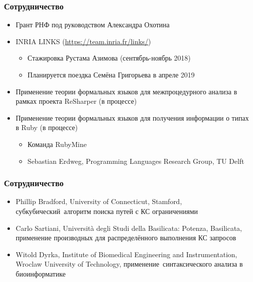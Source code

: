 \documentclass[xcolor=table]{beamer}
\begin{document}
\begin{frame}[fragile]
  \transwipe[direction=90]
  \frametitle{Сотрудничество}
\begin{itemize}
      \item Грант РНФ под руководством Александра Охотина
      \item INRIA LINKS (\url{https://team.inria.fr/links/})
      \begin{itemize}
         \item Стажировка Рустама Азимова (сентябрь-ноябрь 2018)
         \item Планируется поездка Семёна Григорьева в апреле 2019
      \end{itemize}
      \item Применение теории формальных языков для межпроцедурного анализа в рамках проекта ReSharper (в процессе)
      \item Применение теории формальных языков для получения информации о типах в Ruby (в процессе)
      \begin{itemize}
         \item Команда RubyMine
         \item Sebastian Erdweg, Programming Languages Research Group, TU Delft
      \end{itemize}
      
\end{itemize}
\end{frame}

\begin{frame}[fragile]
  \transwipe[direction=90]
  \frametitle{Сотрудничество}
\begin{itemize}
      \item Phillip Bradford, University of Connecticut, Stamford, субкубический~алгоритм поиска путей с КС ограничениями
      \item Carlo Sartiani, Università degli Studi della Basilicata: Potenza, Basilicata, применение производных для распределённого выполнения КС запросов
      \item Witold Dyrka, Institute of Biomedical Engineering and Instrumentation, Wroclaw University of Technology, применение~синтаксического анализа в биоинформатике
      
\end{itemize}
\end{frame}
\end{document}
